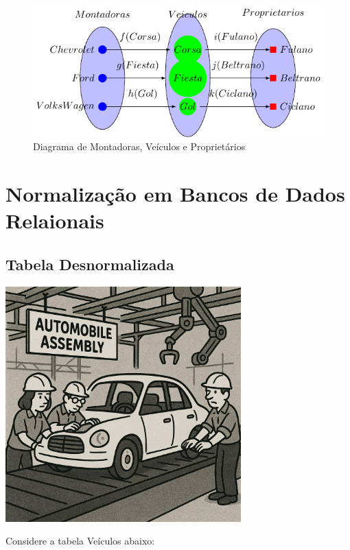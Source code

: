\documentclass[
]{book}
\begin{document}
\begin{figure}
\centering
\includegraphics{2025-GTI-Sem-BancoDeDados_files/figure-latex/tikz-diagrama2-1.pdf}
\caption{\label{fig:tikz-diagrama2}Diagrama de Montadoras, Veículos e Proprietários}
\end{figure}

\section{Normalização em Bancos de Dados Relaionais}\label{normalizauxe7uxe3o-em-bancos-de-dados-relaionais}

\subsection{Tabela Desnormalizada}\label{tabela-desnormalizada}

\includegraphics[width=3.57292in,height=\textheight]{images/5-bi/01-montadora.jpg}

Considere a tabela Veículos abaixo:
\end{document}
